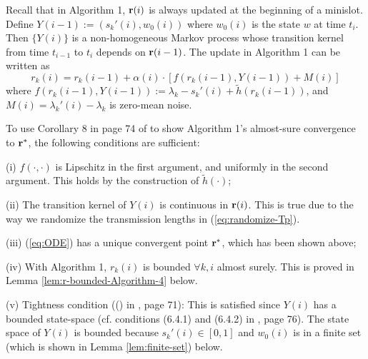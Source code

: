 \documentclass{IEEEtran}
\begin{document}
Recall that in Algorithm 1, ${\bf r}(i)$ is always updated at the
beginning of a minislot. Define $Y(i-1):=(s_{k}'(i),w_{0}(i))$ where
$w_{0}(i)$ is the state $w$ at time $t_{i}$. Then $\{Y(i)\}$ is
a non-homogeneous Markov process whose transition kernel from time
$t_{i-1}$ to $t_{i}$ depends on ${\bf r}(i-1)$. The update in Algorithm
1 can be written as\[
r_{k}(i)=r_{k}(i-1)+\alpha(i)\cdot[f(r_{k}(i-1),Y(i-1))+M(i)]\]
where $f(r_{k}(i-1),Y(i-1)):=\lambda_{k}-s_{k}'(i)+\tilde{h}(r_{k}(i-1))$,
and $M(i)=\lambda_{k}'(i)-\lambda_{k}$ is zero-mean noise.

To use Corollary 8 in page 74 of \cite{Borkar} to show Algorithm
1's almost-sure convergence to ${\bf r}^{*}$, the following conditions
are sufficient: 

(i) $f(\cdot,\cdot)$ is Lipschitz in the first argument, and uniformly
in the second argument. This holds by the construction of $\tilde{h}(\cdot)$; 

(ii) The transition kernel of $Y(i)$ is continuous in ${\bf r}(i)$.
This is true due to the way we randomize the transmission lengths
in (\ref{eq:randomize-Tp}).

(iii) (\ref{eq:ODE}) has a unique convergent point ${\bf r}^{*}$,
which has been shown above; 

(iv) With Algorithm 1, $r_{k}(i)$ is bounded $\forall k,i$ almost
surely. This is proved in Lemma \ref{lem:r-bounded-Algorithm-4} below.

(v) Tightness condition ((\dag{}) in \cite{Borkar}, page 71): This
is satisfied since $Y(i)$ has a bounded state-space (cf. conditions
(6.4.1) and (6.4.2) in \cite{Borkar}, page 76). The state space of
$Y(i)$ is bounded because $s_{k}'(i)\in[0,1]$ and $w_{0}(i)$ is
in a finite set (which is shown in Lemma \ref{lem:finite-set}) below.
\end{document}

